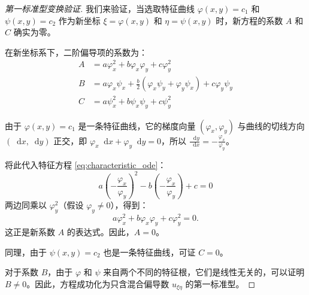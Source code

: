 \documentclass[12pt,a4paper]{article}
\newcommand{\diff}{\mathop{}\!\mathrm{d}}
\numberwithin{subsection}{section}
\numberwithin{subsubsection}{subsection}
\theoremstyle{plain}
\theoremstyle{definition}
\theoremstyle{remark}
\begin{document}
	\begin{proof}[第一标准型变换验证]
		我们来验证，当选取特征曲线 \(\varphi(x,y)=c_1\) 和 \(\psi(x,y)=c_2\) 作为新坐标 \(\xi=\varphi(x,y)\) 和 \(\eta=\psi(x,y)\) 时，新方程的系数 \(A\) 和 \(C\) 确实为零。
		
		在新坐标系下，二阶偏导项的系数为：
		\begin{align*}
			A &= a\varphi_x^2 + b\varphi_x\varphi_y + c\varphi_y^2 \\
			B &= a\varphi_x\psi_x + \frac{b}{2}(\varphi_x\psi_y + \varphi_y\psi_x) + c\varphi_y\psi_y \\
			C &= a\psi_x^2 + b\psi_x\psi_y + c\psi_y^2
		\end{align*}
		
		由于 \(\varphi(x,y)=c_1\) 是一条特征曲线，它的梯度向量 \((\varphi_x, \varphi_y)\) 与曲线的切线方向 \((\diff x, \diff y)\) 正交，即 \(\varphi_x \diff x + \varphi_y \diff y = 0\)，所以 \(\frac{\diff y}{\diff x} = -\frac{\varphi_x}{\varphi_y}\)。
		
		将此代入特征方程 \eqref{eq:characteristic_ode}：
		\[
		a \left(-\frac{\varphi_x}{\varphi_y}\right)^2 - b \left(-\frac{\varphi_x}{\varphi_y}\right) + c = 0
		\]
		两边同乘以 \(\varphi_y^2\)（假设 \(\varphi_y \neq 0\)），得到：
		\[
		a\varphi_x^2 + b\varphi_x\varphi_y + c\varphi_y^2 = 0.
		\]
		这正是新系数 \(A\) 的表达式。因此，\(A=0\)。
		
		同理，由于 \(\psi(x,y)=c_2\) 也是一条特征曲线，可证 \(C=0\)。
		
		对于系数 \(B\)，由于 \(\varphi\) 和 \(\psi\) 来自两个不同的特征根，它们是线性无关的，可以证明 \(B \neq 0\)。因此，方程成功化为只含混合偏导数 \(u_{\xi\eta}\) 的第一标准型。
	\end{proof}
	
\end{document}

